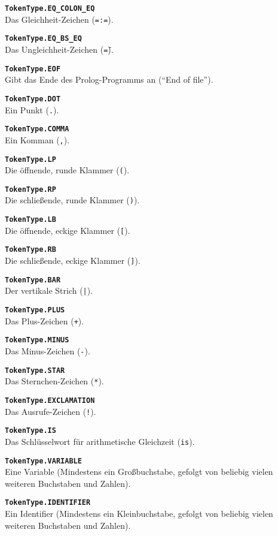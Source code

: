 \documentclass[parskip=full,11pt,twoside]{scrartcl}
\begin{document}
\textbf{\texttt{TokenType.EQ\_COLON\_EQ}}\\
Das Gleichheit-Zeichen (\texttt{=:=}).

\textbf{\texttt{TokenType.EQ\_BS\_EQ}}\\
Das Ungleichheit-Zeichen (\texttt{=\=}).

\textbf{\texttt{TokenType.EOF}}\\
Gibt das Ende des Prolog-Programms an (\enquote{End of file}).

\textbf{\texttt{TokenType.DOT}}\\
Ein Punkt (\texttt{.}).

\textbf{\texttt{TokenType.COMMA}}\\
Ein Komman (\texttt{,}).

\textbf{\texttt{TokenType.LP}}\\
Die öffnende, runde Klammer (\texttt{(}).

\textbf{\texttt{TokenType.RP}}\\
Die schließende, runde Klammer (\texttt{)}).

\textbf{\texttt{TokenType.LB}}\\
Die öffnende, eckige Klammer (\texttt{[}).

\textbf{\texttt{TokenType.RB}}\\
Die schließende, eckige Klammer (\texttt{]}).

\textbf{\texttt{TokenType.BAR}}\\
Der vertikale Strich (\texttt{|}).

\textbf{\texttt{TokenType.PLUS}}\\
Das Plus-Zeichen (\texttt{+}).

\textbf{\texttt{TokenType.MINUS}}\\
Das Minus-Zeichen (\texttt{-}).

\textbf{\texttt{TokenType.STAR}}\\
Das Sternchen-Zeichen (\texttt{*}).

\textbf{\texttt{TokenType.EXCLAMATION}}\\
Das Ausrufe-Zeichen (\texttt{!}).

\textbf{\texttt{TokenType.IS}}\\
Das Schlüsselwort für arithmetische Gleichzeit (\texttt{is}).

\textbf{\texttt{TokenType.VARIABLE}}\\
Eine Variable (Mindestens ein Großbuchstabe, gefolgt von beliebig vielen weiteren Buchstaben und Zahlen).

\textbf{\texttt{TokenType.IDENTIFIER}}\\
Ein Identifier (Mindestens ein Kleinbuchstabe, gefolgt von beliebig vielen weiteren Buchstaben und Zahlen).
\end{document}
